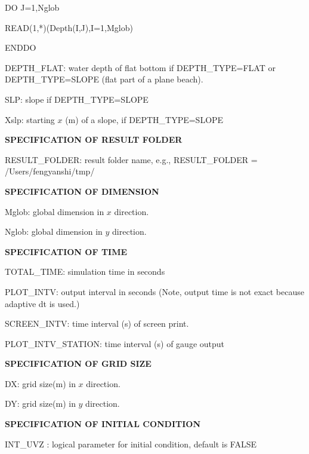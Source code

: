 \documentclass[11pt]{article}
\begin{document}
\begin{description}
       DO J=1,Nglob
       
        READ(1,*)(Depth(I,J),I=1,Mglob)
        
       ENDDO
 
\item DEPTH\_FLAT: water depth of flat bottom if DEPTH\_TYPE=FLAT or DEPTH\_TYPE=SLOPE (flat part of a plane beach).
 
\item SLP: slope if DEPTH\_TYPE=SLOPE

\item Xslp: starting $x$ (m) of a slope, if DEPTH\_TYPE=SLOPE


 \item {\bf SPECIFICATION OF RESULT FOLDER}  
  
\item RESULT\_FOLDER: result folder name, e.g., RESULT\_FOLDER = /Users/fengyanshi/tmp/

 \item {\bf SPECIFICATION OF DIMENSION}

\item Mglob: global dimension in $x$ direction.

\item Nglob: global dimension in $y$ direction.

 \item {\bf SPECIFICATION OF TIME}
 
\item TOTAL\_TIME: simulation time in seconds

\item PLOT\_INTV: output interval in seconds (Note, output time is not exact because adaptive dt is used.)

\item SCREEN\_INTV: time interval (s) of screen print. 

\item PLOT\_INTV\_STATION: time interval (s) of gauge output

 \item {\bf SPECIFICATION OF GRID SIZE}

\item DX: grid size(m) in $x$ direction.

\item DY:   grid size(m) in $y$ direction.

 \item {\bf SPECIFICATION OF INITIAL CONDITION}
 
 \item INT\_UVZ : logical parameter for initial condition, default is FALSE
 

\end{description}
\end{document}
